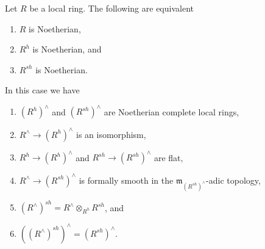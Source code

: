\begin{lemma}
\label{lemma-henselization-noetherian}
\begin{reference}
\cite[IV, Theorem 18.6.6 and Proposition 18.8.8]{EGA}
\end{reference}
Let $R$ be a local ring. The following are equivalent
\begin{enumerate}
\item $R$ is Noetherian,
\item $R^h$ is Noetherian, and
\item $R^{sh}$ is Noetherian.
\end{enumerate}
In this case we have
\begin{enumerate}
\item[(a)] $(R^h)^\wedge$ and $(R^{sh})^\wedge$ are Noetherian complete
local rings,
\item[(b)] $R^\wedge \to (R^h)^\wedge$ is an isomorphism,
\item[(c)] $R^h \to (R^h)^\wedge$ and $R^{sh} \to (R^{sh})^\wedge$ are flat,
\item[(d)] $R^\wedge \to (R^{sh})^\wedge$ is formally smooth in
the $\mathfrak m_{(R^{sh})^\wedge}$-adic topology,
\item[(e)] $(R^\wedge)^{sh} = R^\wedge \otimes_{R^h} R^{sh}$, and
\item[(f)] $((R^\wedge)^{sh})^\wedge = (R^{sh})^\wedge$.
\end{enumerate}
\end{lemma}

